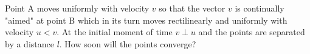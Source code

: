 
\item Point A moves uniformly with velocity \( v \) so that the vector \( v \) is continually "aimed" at point B which in its turn moves rectilinearly and uniformly with velocity \( u < v \). At the initial moment of time \( v \perp u \) and the points are separated by a distance \( l \). How soon will the points converge?
